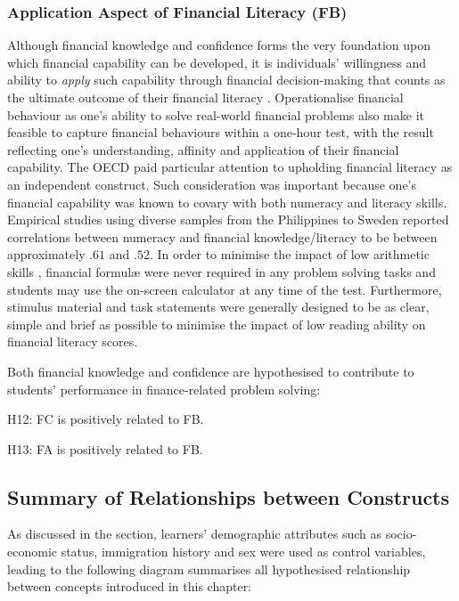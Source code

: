 \subsubsection{Application Aspect of Financial Literacy (FB)}

Although financial knowledge and confidence forms the very foundation upon which financial capability can be developed, it is individuals' willingness and ability to \emph{apply} such capability through financial decision-making that counts as the ultimate outcome of their financial literacy \parencite{huston:2010}. Operationalise financial behaviour as one's ability to solve real-world financial problems also make it feasible to capture financial behaviours within a one-hour test, with the result reflecting one's understanding, affinity and application of their financial capability. The OECD paid particular attention to upholding financial literacy as an independent construct. Such consideration was important because one's financial capability was known to covary with both numeracy \parencite{geiger:2020, ozkale:2020a, ozkale:2020b, sole:2014} and literacy \parencite{bay:2014} skills. Empirical studies using diverse samples from the Philippines \parencite{indefenso:2020} to Sweden \parencite{skagerlund:2018} reported correlations between numeracy and financial knowledge/literacy to be between approximately $.61$ and $.52$. In order to minimise the impact of low arithmetic skills \parencite{huston:2010}, financial formul{\ae} were never required in any problem solving tasks and students may use the on-screen calculator at any time of the test. Furthermore, stimulus material and task statements were generally designed to be as clear, simple and brief as possible to minimise the impact of low reading ability on financial literacy scores.

Both financial knowledge and confidence are hypothesised to contribute to students' performance in finance-related problem solving:
\begin{MAEitemize}
    \item[H12:] FC is positively related to FB.
    \item[H13:] FA is positively related to FB.
\end{MAEitemize}

\subsection{Summary of Relationships between Constructs}

As discussed in the  section, learners' demographic attributes such as socio-economic status, immigration history and sex were used as control variables, leading to the following diagram summarises all hypothesised relationship between concepts introduced in this chapter:


